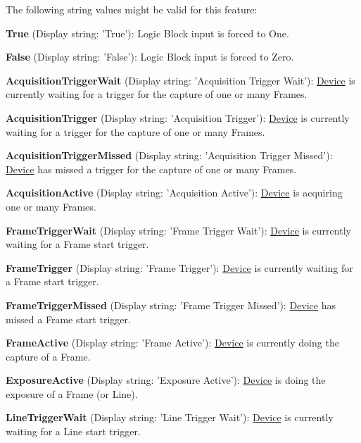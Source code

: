 The following string values might be valid for this feature\+:
\begin{DoxyItemize}
\item {\bfseries True} (Display string\+: 'True')\+: Logic Block input is forced to One.
\item {\bfseries False} (Display string\+: 'False')\+: Logic Block input is forced to Zero.
\item {\bfseries Acquisition\+Trigger\+Wait} (Display string\+: 'Acquisition Trigger Wait')\+: \hyperlink{classmv_i_m_p_a_c_t_1_1acquire_1_1_device}{Device} is currently waiting for a trigger for the capture of one or many Frames.
\item {\bfseries Acquisition\+Trigger} (Display string\+: 'Acquisition Trigger')\+: \hyperlink{classmv_i_m_p_a_c_t_1_1acquire_1_1_device}{Device} is currently waiting for a trigger for the capture of one or many Frames.
\item {\bfseries Acquisition\+Trigger\+Missed} (Display string\+: 'Acquisition Trigger Missed')\+: \hyperlink{classmv_i_m_p_a_c_t_1_1acquire_1_1_device}{Device} has missed a trigger for the capture of one or many Frames.
\item {\bfseries Acquisition\+Active} (Display string\+: 'Acquisition Active')\+: \hyperlink{classmv_i_m_p_a_c_t_1_1acquire_1_1_device}{Device} is acquiring one or many Frames.
\item {\bfseries Frame\+Trigger\+Wait} (Display string\+: 'Frame Trigger Wait')\+: \hyperlink{classmv_i_m_p_a_c_t_1_1acquire_1_1_device}{Device} is currently waiting for a Frame start trigger.
\item {\bfseries Frame\+Trigger} (Display string\+: 'Frame Trigger')\+: \hyperlink{classmv_i_m_p_a_c_t_1_1acquire_1_1_device}{Device} is currently waiting for a Frame start trigger.
\item {\bfseries Frame\+Trigger\+Missed} (Display string\+: 'Frame Trigger Missed')\+: \hyperlink{classmv_i_m_p_a_c_t_1_1acquire_1_1_device}{Device} has missed a Frame start trigger.
\item {\bfseries Frame\+Active} (Display string\+: 'Frame Active')\+: \hyperlink{classmv_i_m_p_a_c_t_1_1acquire_1_1_device}{Device} is currently doing the capture of a Frame.
\item {\bfseries Exposure\+Active} (Display string\+: 'Exposure Active')\+: \hyperlink{classmv_i_m_p_a_c_t_1_1acquire_1_1_device}{Device} is doing the exposure of a Frame (or Line).
\item {\bfseries Line\+Trigger\+Wait} (Display string\+: 'Line Trigger Wait')\+: \hyperlink{classmv_i_m_p_a_c_t_1_1acquire_1_1_device}{Device} is currently waiting for a Line start trigger.

\end{DoxyItemize}
